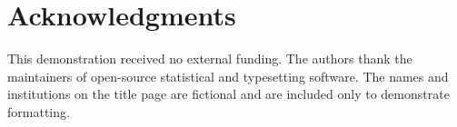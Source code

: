 \section{Acknowledgments}
This demonstration received no external funding. The authors thank the maintainers
of open-source statistical and typesetting software. The names and institutions
on the title page are fictional and are included only to demonstrate formatting.
